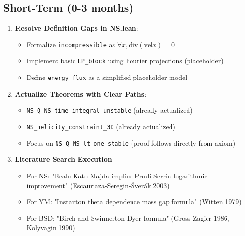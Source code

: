 \documentclass[11pt]{article}
\begin{document}
\subsection{Short-Term (0-3 months)}
\begin{enumerate}
\item \textbf{Resolve Definition Gaps in NS.lean}:
  \begin{itemize}
  \item Formalize \texttt{incompressible} as $\forall x, \mathrm{div} (\mathrm{vel} x) = 0$
  \item Implement basic \texttt{LP\_block} using Fourier projections (placeholder)
  \item Define \texttt{energy\_flux} as a simplified placeholder model
  \end{itemize}
\item \textbf{Actualize Theorems with Clear Paths}:
  \begin{itemize}
  \item \texttt{NS\_Q\_NS\_time\_integral\_unstable} (already actualized)
  \item \texttt{NS\_helicity\_constraint\_3D} (already actualized)
  \item Focus on \texttt{NS\_Q\_NS\_lt\_one\_stable} (proof follows directly from axiom)
  \end{itemize}
\item \textbf{Literature Search Execution}:
  \begin{itemize}
  \item For NS: "Beale-Kato-Majda implies Prodi-Serrin logarithmic improvement" (Escauriaza-Seregin-\v{S}ver\'ak 2003)
  \item For YM: "Instanton theta dependence mass gap formula" (Witten 1979)
  \item For BSD: "Birch and Swinnerton-Dyer formula" (Gross-Zagier 1986, Kolyvagin 1990)
  \end{itemize}
\end{enumerate}
\end{document}
